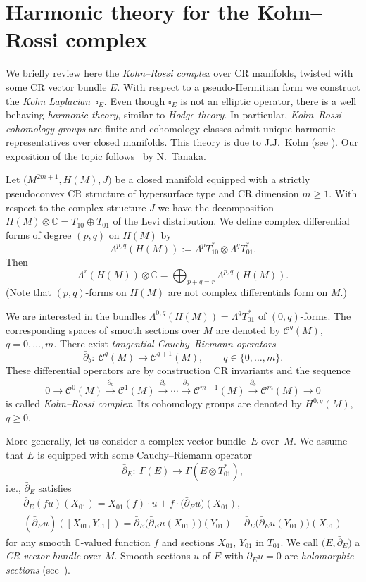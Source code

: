 \documentclass[10pt,a4paper]{amsart}
\numberwithin{equation}{section}
\newcommand{\CC}{\mathbb{C}}
\begin{document}
\section{Harmonic theory for the Kohn--Rossi complex} \label{Sec9}

We briefly review here the {\em Kohn--Rossi complex} \cite{KR} over
CR manifolds, twisted with some CR vector bundle $E$.
With respect to a pseudo-Hermitian form we construct the {\em Kohn Laplacian}~$\square_E$. Even though
$\square_E$ is not an elliptic operator,
there is a well behaving {\em harmonic theory}, similar to {\em Hodge theory}.
In particular, {\em Kohn--Rossi cohomology groups} are finite
and cohomology classes admit unique harmonic representatives over closed manifolds. This theory is due to J.J.~Kohn (see \cite{FK, Koh}). Our exposition of the topic follows~\cite{Tan} by N.~Tanaka.

Let $\big(M^{2m+1}, H(M), J\big)$ be a closed manifold equipped with a strictly pseudoconvex CR structure of hypersurface type and CR dimension $m\geq 1$.
With respect to the complex structure $J$ we have the decomposition $H(M)\otimes \CC=T_{10}\oplus T_{01}$
of the Levi distribution.
We define complex differential forms of degree $(p,q)$ on $H(M)$ by
\[
\Lambda^{p,q}(H(M)) := \Lambda^p T_{10}^* \otimes \Lambda^q T_{01}^*.
\]
Then
\[
\Lambda^r(H(M))\otimes\CC = \bigoplus_{p+q=r} \Lambda^{p,q}(H(M)).
\]
(Note that $(p,q)$-forms on $H(M)$ are not complex differentials form on $M$.)

We are interested in the bundles $\Lambda^{0,q}(H(M))=\Lambda^q T_{01}^*$ of $(0,q)$-forms.
The corresponding spaces of smooth sections over $M$ are denoted by $\mathcal{C}^q(M)$, $q=0,\dots, m$.
There exist {\em tangential Cauchy--Riemann operators}
\[
\bar{\partial}_b\colon \ \mathcal{C}^q(M) \to \mathcal{C}^{q+1}(M),\qquad q\in\{0,\dots,m\}.
\]
These differential operators are by construction CR invariants and
the sequence
\[
0\longrightarrow \mathcal{C}^0(M) \stackrel{\bar{\partial}_b}{\longrightarrow} \mathcal{C}^1(M) \stackrel{\bar{\partial}_b}{\longrightarrow} \cdots
 \stackrel{\bar{\partial}_b}{\longrightarrow} \mathcal{C}^{m-1}(M) \stackrel{\bar{\partial}_b}{\longrightarrow} \mathcal{C}^m(M)\longrightarrow 0
\]
is called {\em Kohn--Rossi complex}. Its cohomology groups are denoted by $H^{0,q}(M)$, $q\geq 0$.

More generally, let us consider a complex vector bundle~$E$ over~$M$. We assume that $E$ is equipped with some Cauchy--Riemann operator
\[ \bar{\partial}_E\colon \ \Gamma(E) \to \Gamma(E\otimes T_{01}^*),\]
i.e., $\bar{\partial}_E$ satisfies
\begin{gather*} \bar{\partial}_E(fu)(X_{01})=X_{01}(f)\cdot u+ f\cdot \big(\bar{\partial}_Eu\big)(X_{01}),\\
(\bar{\partial}_Eu)([X_{01},Y_{01}])=\bar{\partial}_E\big(\bar{\partial}_Eu(X_{01})\big)(Y_{01})- \bar{\partial}_E\big(\bar{\partial}_Eu(Y_{01})\big)(X_{01})
\end{gather*}
for any smooth $\CC$-valued function $f$ and sections $X_{01}$, $Y_{01}$ in $T_{01}$. We call $\big(E,\bar{\partial}_E\big)$ a {\em CR vector bundle} over $M$. Smooth sections $u$ of $E$ with $\bar{\partial}_Eu=0$ are {\em holomorphic sections} (see~\cite{Tan}).
\end{document}
